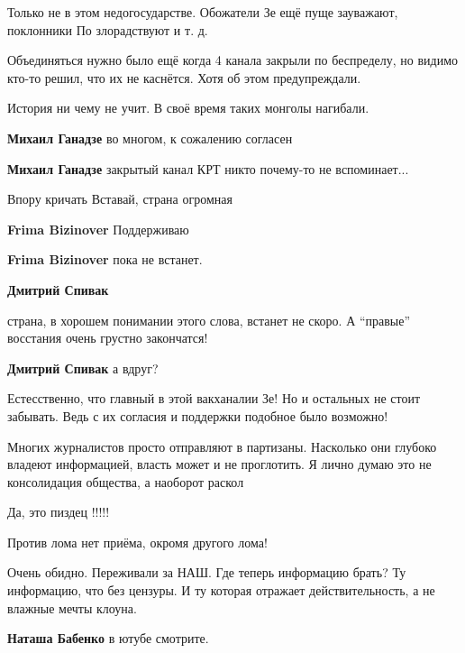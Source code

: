 \begin{itemize}
Только не в этом недогосударстве. Обожатели Зе ещё пуще зауважают, поклонники
По злорадствуют и т. д.

Объединяться нужно было ещё когда 4 канала закрыли по беспределу, но видимо
кто-то решил, что их не каснётся. Хотя об этом предупреждали.

История ни чему не учит. В своё время таких монголы нагибали.

\begin{itemize} %
\textbf{Михаил Ганадзе} во многом, к сожалению согласен

\textbf{Михаил Ганадзе} закрытый канал КРТ никто почему-то не вспоминает...
\end{itemize} %

Впору кричать Вставай, страна огромная

\begin{itemize} %
\textbf{Frima Bizinover} Поддерживаю


\textbf{Frima Bizinover} пока не встанет.

\textbf{Дмитрий Спивак} 

страна, в хорошем понимании этого слова, встанет не скоро. А \enquote{правые} восстания
очень грустно закончатся!


\textbf{Дмитрий Спивак} а вдруг?
\end{itemize} %


Естесственно, что главный в этой вакханалии Зе! Но и остальных не стоит
забывать. Ведь с их согласия и поддержки подобное было возможно!



Многих журналистов просто отправляют в партизаны. Насколько они глубоко владеют
информацией, власть может и не проглотить. Я лично думаю это не консолидация
общества, а наоборот раскол

Да, это пиздец !!!!!

Против лома нет приёма, окромя другого лома!


Очень обидно. Переживали за НАШ. Где теперь информацию брать? Ту информацию, что
без цензуры. И ту которая отражает действительность, а не влажные мечты клоуна.

\begin{itemize} %
\textbf{Наташа Бабенко} в ютубе смотрите.


\end{itemize}
\end{itemize}
